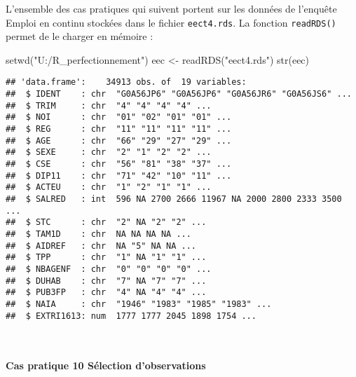 \documentclass[12pt,]{article}
\newenvironment{Shaded}{}{}
\newcommand{\KeywordTok}[1]{\textcolor[rgb]{0.00,0.00,1.00}{{#1}}}
\newcommand{\StringTok}[1]{\textcolor[rgb]{0.00,0.50,0.50}{{#1}}}
\newcommand{\NormalTok}[1]{{#1}}
\let\oldparagraph\paragraph
\renewcommand{\paragraph}[1]{\oldparagraph{#1}\mbox{}}
\begin{document}
L'ensemble des cas pratiques qui suivent portent sur les données de
l'enquête Emploi en continu stockées dans le fichier \texttt{eect4.rds}.
La fonction \texttt{readRDS()} permet de le charger en mémoire :

\begin{Shaded}
\begin{Highlighting}[]
\KeywordTok{setwd}\NormalTok{(}\StringTok{"U:/R_perfectionnement"}\NormalTok{)}
\NormalTok{eec <-}\StringTok{ }\KeywordTok{readRDS}\NormalTok{(}\StringTok{"eect4.rds"}\NormalTok{)}
\KeywordTok{str}\NormalTok{(eec)}
\end{Highlighting}
\end{Shaded}

\begin{verbatim}
## 'data.frame':    34913 obs. of  19 variables:
##  $ IDENT    : chr  "G0A56JP6" "G0A56JP6" "G0A56JR6" "G0A56JS6" ...
##  $ TRIM     : chr  "4" "4" "4" "4" ...
##  $ NOI      : chr  "01" "02" "01" "01" ...
##  $ REG      : chr  "11" "11" "11" "11" ...
##  $ AGE      : chr  "66" "29" "27" "29" ...
##  $ SEXE     : chr  "2" "1" "2" "2" ...
##  $ CSE      : chr  "56" "81" "38" "37" ...
##  $ DIP11    : chr  "71" "42" "10" "11" ...
##  $ ACTEU    : chr  "1" "2" "1" "1" ...
##  $ SALRED   : int  596 NA 2700 2666 11967 NA 2000 2800 2333 3500 ...
##  $ STC      : chr  "2" NA "2" "2" ...
##  $ TAM1D    : chr  NA NA NA NA ...
##  $ AIDREF   : chr  NA "5" NA NA ...
##  $ TPP      : chr  "1" NA "1" "1" ...
##  $ NBAGENF  : chr  "0" "0" "0" "0" ...
##  $ DUHAB    : chr  "7" NA "7" "7" ...
##  $ PUB3FP   : chr  "4" NA "4" "4" ...
##  $ NAIA     : chr  "1946" "1983" "1985" "1983" ...
##  $ EXTRI1613: num  1777 1777 2045 1898 1754 ...
\end{verbatim}

~

\paragraph{\texorpdfstring{\textbf{Cas pratique 10} Sélection
d'observations}{Cas pratique 10 Sélection d'observations}}\label{cas-pratique-10-selection-dobservations}
\end{document}
